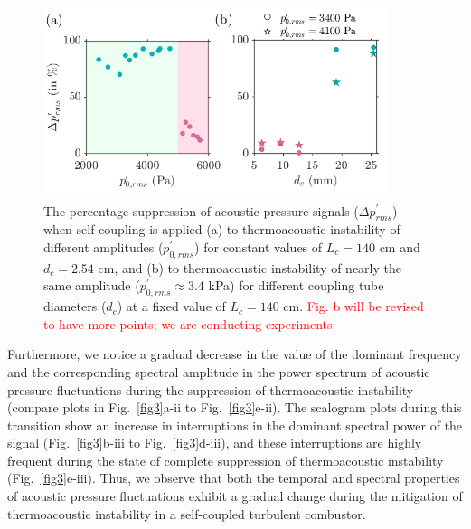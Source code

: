 \documentclass[%
preprint,
 amsmath,amssymb,
 aps,
 pra,
]{revtex4-2}
\begin{document}
\begin{figure}[t!]
\centering
\includegraphics[width=0.9\textwidth]{diff_amp_and_dia.png}
\caption{The percentage suppression of acoustic pressure signals ($\Delta p^\prime_{rms}$) when self-coupling is applied (a) to thermoacoustic instability of different amplitudes ($p^\prime_{0,rms}$) for constant values of $L_{c} = 140$ cm and $d_c = 2.54$ cm, and (b) to thermoacoustic instability of nearly the same amplitude  ($p^\prime_{0,rms} \approx 3.4$ kPa) for different coupling tube diameters ($d_c$) at a fixed value of $L_c = 140$ cm. \textcolor{red}{Fig. b will be revised to have more points; we are conducting experiments.}}
\label{diff_amp_dia}
\end{figure}

Furthermore, we notice a gradual decrease in the value of the dominant frequency and the corresponding spectral amplitude in the power spectrum of acoustic pressure fluctuations during the suppression of thermoacoustic instability (compare plots in Fig.~\ref{fig3}a-ii to Fig.~\ref{fig3}e-ii). The scalogram plots during this transition show an increase in interruptions in the dominant spectral power of the signal (Fig.~\ref{fig3}b-iii to Fig.~\ref{fig3}d-iii), and these interruptions are highly frequent during the state of complete suppression of thermoacoustic instability (Fig.~\ref{fig3}e-iii). Thus, we observe that both the temporal and spectral properties of acoustic pressure fluctuations exhibit a gradual change during the mitigation of thermoacoustic instability in a self-coupled turbulent combustor.
\end{document}
